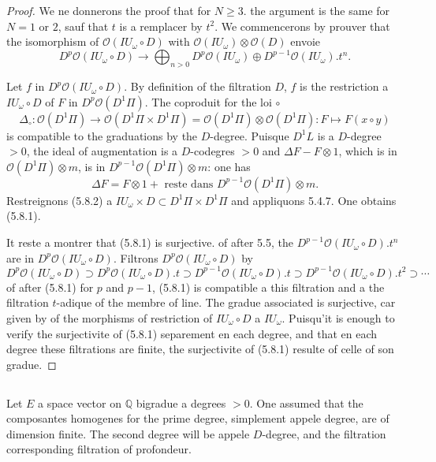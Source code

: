 \documentclass[11pt,a4paper]{article}
\theoremstyle{plain}
\theoremstyle{definition}
\newcommand{\Q}{\mathbb{Q}}
\begin{document}
\begin{proof}
We ne donnerons the proof that for $N \geq 3$. the argument is the same for $N=1$ or $2$, sauf that $t$ is a remplacer by $t^2$. We commencerons by prouver that the isomorphism of $\mathcal{O}(IU_\omega \circ D)$ with $\mathcal{O}(IU_\omega) \otimes \mathcal{O}(D)$ envoie
\begin{equation}\label{eq:5.8.1}
D^p \mathcal{O}(IU_\omega \circ D) \to \bigoplus_{n > 0} D^p \mathcal{O}(IU_\omega) \oplus D^{p-1} \mathcal{O}(IU_\omega).t^n.
\end{equation}

Let $f$ in $D^p \mathcal{O}(IU_\omega \circ D)$. By definition of the filtration $D$, $f$ is the restriction a $IU_\omega \circ D$ of $F$ in $D^p \mathcal{O}(D^1\Pi)$. The coproduit for the loi $\circ$
\[
\Delta_\circ: \mathcal{O}(D^1\Pi) \to \mathcal{O}(D^1\Pi \times D^1\Pi) = \mathcal{O}(D^1\Pi) \otimes \mathcal{O}(D^1\Pi): F \mapsto F(x \circ y)
\]
is compatible to the graduations by the $D$-degree. Puisque $D^1L$ is a $D$-degree $> 0$, the ideal of augmentation is a $D$-codegres $> 0$ and $\Delta F - F \otimes 1$, which is in $\mathcal{O}(D^1\Pi) \otimes m$, is in $D^{p-1} \mathcal{O}(D^1\Pi) \otimes m$: one has
\begin{equation}\label{eq:5.8.2}
\Delta F = F \otimes 1 + \text{ reste dans } D^{p-1} \mathcal{O}(D^1\Pi) \otimes m.
\end{equation}
Restreignons (5.8.2) a $IU_\omega \times D \subset D^1\Pi \times D^1\Pi$ and appliquons 5.4.7. One obtains (5.8.1).

It reste a montrer that (5.8.1) is surjective. of after 5.5, the $D^{p-1} \mathcal{O}(IU_\omega \circ D).t^n$ are in $D^p \mathcal{O}(IU_\omega \circ D)$. Filtrons $D^p \mathcal{O}(IU_\omega \circ D)$ by
\[
D^p \mathcal{O}(IU_\omega \circ D) \supset D^p \mathcal{O}(IU_\omega \circ D).t \supset D^{p-1} \mathcal{O}(IU_\omega \circ D).t \supset D^{p-1} \mathcal{O}(IU_\omega \circ D).t^2 \supset \cdots
\]
of after (5.8.1) for $p$ and $p-1$, (5.8.1) is compatible a this filtration and a the filtration $t$-adique of the membre of line. The gradue associated is surjective, car given by of the morphisms of restriction of $IU_\omega \circ D$ a $IU_\omega$. Puisqu'it is enough to verify the surjectivite of (5.8.1) separement en each degree, and that en each degree these filtrations are finite, the surjectivite of (5.8.1) resulte of celle of son gradue.
\end{proof}

\subsection{}
Let $E$ a space vector on $\Q$ bigradue a degrees $> 0$. One assumed that the composantes homogenes for the prime degree, simplement appele degree, are of dimension finite. The second degree will be appele $D$-degree, and the filtration corresponding filtration of profondeur.
\end{document}
